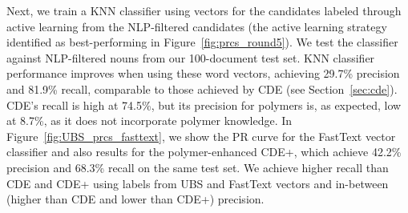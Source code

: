Next, we train a KNN classifier using vectors for the candidates labeled through active learning from the NLP-filtered candidates (the active learning strategy identified as best-performing in Figure~\ref{fig:prcs_round5}).
We test the classifier against NLP-filtered nouns from our 100-document test set.
KNN classifier performance improves when using these word vectors, 
achieving 29.7\% precision and 81.9\% recall,
comparable to those achieved by CDE (see Section~\ref{sec:cde}).
CDE's recall is high
at 74.5\%, but its precision for polymers is, as expected, low at 8.7\%, as it does not incorporate polymer knowledge. 
In Figure~\ref{fig:UBS_prcs_fasttext}, we show the PR curve for the FastText vector classifier
and also results for the polymer-enhanced CDE+,
which achieve 42.2\% precision and 68.3\% recall on the same test set.
We achieve higher recall than CDE and CDE+ using labels from UBS and FastText vectors 
and in-between (higher than CDE and lower than CDE+)
precision.%

